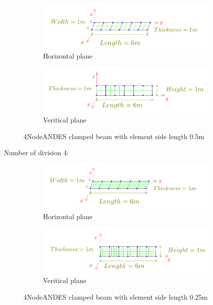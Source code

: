 \documentclass[fleqn,11pt,letter]{article}
\begin{document}
\begin{figure}[H]
  \centering
    \begin{subfigure}{0.5\textwidth}
      \centering
      \includegraphics[width=9cm]{../Figure_files/4NodeANDES/beam_ANDES_xy_more_2.pdf}
      \caption{Horizontal plane}
    \end{subfigure}
    \begin{subfigure}{0.5\textwidth}
      \centering
      \includegraphics[width=9cm]{../Figure_files/4NodeANDES/beam_ANDES_yz_more_2.pdf}
      \caption{Veritical  plane}
    \end{subfigure}
  \caption{4NodeANDES clamped beam with element side length 0.5m }
  \label{fig 4NodeANDES clamped beams with element side length 0.5m}
\end{figure}






Number of division 4:

\begin{figure}[H]
  \centering
    \begin{subfigure}{0.5\textwidth}
      \centering
      \includegraphics[width=9cm]{../Figure_files/4NodeANDES/beam_ANDES_xy_more.pdf}
      \caption{Horizontal plane}
    \end{subfigure}
    \begin{subfigure}{0.5\textwidth}
      \centering
      \includegraphics[width=9cm]{../Figure_files/4NodeANDES/beam_ANDES_yz_more.pdf}
      \caption{Veritical  plane}
    \end{subfigure}
  \caption{4NodeANDES clamped beam with element side length 0.25m }
  \label{fig 4NodeANDES clamped beams with element side length 0.25m}
\end{figure}
\end{document}
